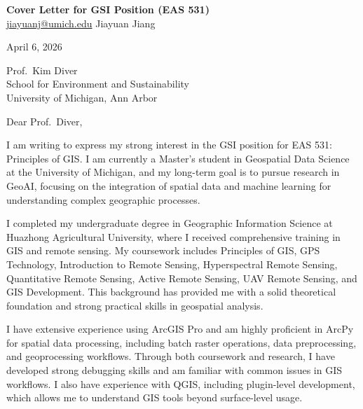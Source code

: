\documentclass[11pt, letterpaper]{article}
\begin{document}
\begin{center}
  {\LARGE \textbf{Cover Letter for GSI Position (EAS 531)}} \\[4pt]
  \href{mailto:jiayuanj@umich.edu}{jiayuanj@umich.edu} \quad
  Jiayuan Jiang
\end{center}

\vspace{8pt}

\noindent April 6, 2026

\vspace{8pt}

\noindent Prof.\ Kim Diver \\
School for Environment and Sustainability \\
University of Michigan, Ann Arbor

\vspace{12pt}

\noindent Dear Prof.\ Diver,

\vspace{8pt}


I am writing to express my strong interest in the GSI position for EAS 531: Principles of GIS. I am currently a Master’s student in Geospatial Data Science at the University of Michigan, and my long-term goal is to pursue research in GeoAI, focusing on the integration of spatial data and machine learning for understanding complex geographic processes.

I completed my undergraduate degree in Geographic Information Science at Huazhong Agricultural University, where I received comprehensive training in GIS and remote sensing. My coursework includes Principles of GIS, GPS Technology, Introduction to Remote Sensing, Hyperspectral Remote Sensing, Quantitative Remote Sensing, Active Remote Sensing, UAV Remote Sensing, and GIS Development. This background has provided me with a solid theoretical foundation and strong practical skills in geospatial analysis.

I have extensive experience using ArcGIS Pro and am highly proficient in ArcPy for spatial data processing, including batch raster operations, data preprocessing, and geoprocessing workflows. Through both coursework and research, I have developed strong debugging skills and am familiar with common issues in GIS workflows. I also have experience with QGIS, including plugin-level development, which allows me to understand GIS tools beyond surface-level usage.
\end{document}
